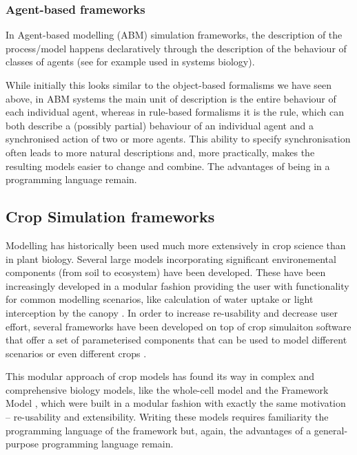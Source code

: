 \subsubsection*{Agent-based frameworks}
In Agent-based modelling (ABM) simulation frameworks, the description of the
process/model happens declaratively through the description of the behaviour of
classes of agents (see for example \cite{solovyev2010spark} used in systems
biology).

While initially this looks similar to the object-based formalisms we have seen
above, in ABM systems the main unit of description is the entire behaviour of
each individual agent, whereas in rule-based formalisms it is the rule, which
can both describe a (possibly partial) behaviour of an individual agent and a
synchronised action of two or more agents. This ability to specify
synchronisation often leads to more natural descriptions and, more practically,
makes the resulting models easier to change and combine. The advantages of being
in a programming language remain.

\subsection{Crop Simulation frameworks}
Modelling has historically been used much more extensively in crop science than
in plant biology. Several large models incorporating significant environemental
components (from soil to ecosystem) have been developed. These have been
increasingly developed in a modular fashion providing the user with
functionality for common modelling scenarios, like calculation of water uptake
or light interception by the canopy \citep{keating_overview_2003}. In order to
increase re-usability and decrease user effort, several frameworks have been
developed on top of crop simulaiton software that offer a set of parameterised
components that can be used to model different scenarios or even different crops
\citep{brown_plant_2014}.

This modular approach of crop models has found its way in complex and
comprehensive biology models, like the \citet{karr_whole-cell_2012} whole-cell
model and the Framework Model \citep{chew2014multiscale}, which were built in a
modular fashion with exactly the same motivation -- re-usability and
extensibility. Writing these models requires familiarity the programming
language of the framework but, again, the advantages of a general-purpose
programming language remain.


